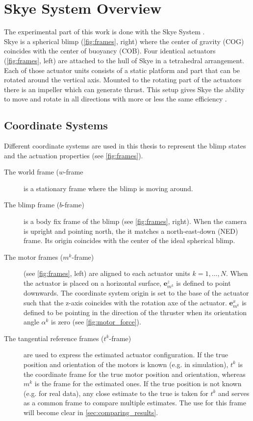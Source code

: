 \section{Skye System Overview}
The experimental part of this work is done with the Skye System \citep{Skye2013}.\\
Skye is a spherical blimp (\cref{fig:frames}, right) where the center of gravity (COG) coincides with the center of buoyancy (COB).
Four identical actuators (\cref{fig:frames}, left) are attached to the hull of Skye in a tetrahedral arrangement.
Each of those actuator units consists of a static platform and part that can be rotated around the vertical axis.
Mounted to the rotating part of the actuators there is an impeller which can generate thrust.
This setup gives Skye the ability to move and rotate in all directions with more or less the same efficiency \citep[see][chap. 3]{Schaffner2012}.

\subsection{Coordinate Systems}
\label{sub:coordinate_systems}
Different coordinate systems are used in this thesis to represent the blimp states and the actuation properties (see \cref{fig:frames}).
\begin{description}
\item[The world frame ($w$-frame] is a stationary frame where the blimp is moving around.
\item[The blimp frame ($b$-frame)] is a body fix frame of the blimp (see \cref{fig:frames}, right).
When the camera is upright and pointing north, the it matches a north-east-down (NED) frame.
Its origin coincides with the center of the ideal spherical blimp.
\item[The motor frames ($m^k$-frame)] (see \cref{fig:frames}, left) are aligned to each actuator units $k=1,...,N$.
When the actuator is placed on a horizontal surface, $\mathbf{e}_{m^k}^z$ is defined to point downwards.
The coordinate system origin is set to the base of the actuator such that the z-axis coincides with the rotation axe of the actuator.
$\mathbf{e}_{m^k}^x$ is defined to be pointing in the direction of the thruster when its orientation angle $\alpha^k$ is zero (see \cref{fig:motor_force}).
\item[The tangential reference frames ($t^k$-frame)] are used to express the estimated actuator configuration.
If the true position and orientation of the motors is known (e.g. in simulation), $t^k$ is the coordinate frame for the true motor position and orientation, whereas $m^k$ is the frame for the estimated ones.
If the true position is not known (e.g. for real data), any close estimate to the true is taken for $t^k$ and serves as a common frame to compare multiple estimates.
The use for this frame will become clear in \cref{sec:comparing_results}.
\end{description}

